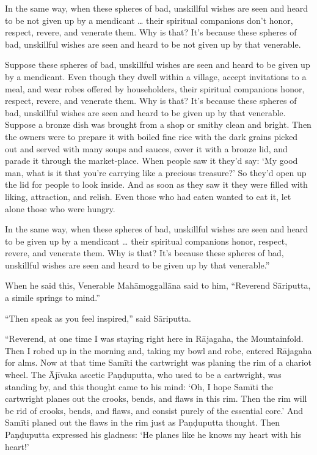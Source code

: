 \documentclass[12pt,openany]{book}%
\begin{document}
In the same way, when these spheres of bad, unskillful wishes are seen and heard to be not given up by a mendicant … their spiritual companions don’t honor, respect, revere, and venerate them. Why is that? It’s because these spheres of bad, unskillful wishes are seen and heard to be not given up by that venerable. 

Suppose these spheres of bad, unskillful wishes are seen and heard to be given up by a mendicant. Even though they dwell within a village, accept invitations to a meal, and wear robes offered by householders, their spiritual companions honor, respect, revere, and venerate them. Why is that? It’s because these spheres of bad, unskillful wishes are seen and heard to be given up by that venerable. Suppose a bronze dish was brought from a shop or smithy clean and bright. Then the owners were to prepare it with boiled fine rice with the dark grains picked out and served with many soups and sauces, cover it with a bronze lid, and parade it through the market-place. When people saw it they’d say: ‘My good man, what is it that you’re carrying like a precious treasure?’ So they’d open up the lid for people to look inside. And as soon as they saw it they were filled with liking, attraction, and relish. Even those who had eaten wanted to eat it, let alone those who were hungry. 

In the same way, when these spheres of bad, unskillful wishes are seen and heard to be given up by a mendicant … their spiritual companions honor, respect, revere, and venerate them. Why is that? It’s because these spheres of bad, unskillful wishes are seen and heard to be given up by that venerable.” 

When he said this, Venerable \textsanskrit{Mahāmoggallāna} said to him, “Reverend \textsanskrit{Sāriputta}, a simile springs to mind.” 

“Then speak as you feel inspired,” said \textsanskrit{Sāriputta}. 

“Reverend, at one time I was staying right here in \textsanskrit{Rājagaha}, the Mountainfold. Then I robed up in the morning and, taking my bowl and robe, entered \textsanskrit{Rājagaha} for alms. Now at that time \textsanskrit{Samīti} the cartwright was planing the rim of a chariot wheel. The \textsanskrit{Ājīvaka} ascetic \textsanskrit{Paṇḍuputta}, who used to be a cartwright, was standing by, and this thought came to his mind: ‘Oh, I hope \textsanskrit{Samīti} the cartwright planes out the crooks, bends, and flaws in this rim. Then the rim will be rid of crooks, bends, and flaws, and consist purely of the essential core.’ And \textsanskrit{Samīti} planed out the flaws in the rim just as \textsanskrit{Paṇḍuputta} thought. Then \textsanskrit{Paṇḍuputta} expressed his gladness: ‘He planes like he knows my heart with his heart!’ 
\end{document}
